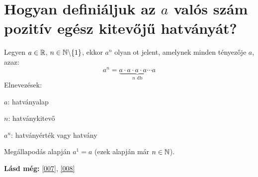 
\section{Hogyan definiáljuk az \texorpdfstring{$a$}{a} valós szám pozitív egész
kitevőjű hatványát?}
\label{006}

\begin{defin}[Hatvány]
\label{def:power}
Legyen $a \in \mathbb{R}$, $n \in \mathbb{N} \backslash \{1\}$, ekkor $a^n$ olyan
ot jelent, amelynek minden tényezője $a$, azaz:
\[
a^n = \underbrace{a \cdot a \cdot a \cdot a \cdots{ } a}_{n \text{ db}}
\]
Elnevezések:

$a$: hatványalap

$n$: hatványkitevő

$a^n$: hatványérték vagy hatvány

Megállapodás alapján $a^1 = a$ (ezek alapján már $n \in \mathbb{N}$).
\end{defin}

\textbf{Lásd még:} \ref{007}, \ref{008}
